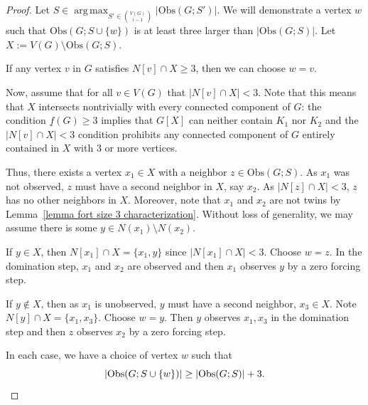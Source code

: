 \documentclass{article}
\DeclareMathOperator*{\argmax}{arg\,max}
\begin{document}
        \begin{proof}
            Let $S\in \displaystyle\argmax_{S'\in\binom{V(G)}{i-1}} |\mathrm{Obs}(G;S')|$.
            We will demonstrate a vertex $w$ such that $\mathrm{Obs}(G;S\cup \{w\})$ is at least three larger than $|\mathrm{Obs}(G;S)|$.
            Let $X:=V(G)\setminus \mathrm{Obs}(G;S)$.
            
            If any vertex $v$ in $G$ satisfies $N[v]\cap X\geq 3$, then we can choose $w=v$. 

            Now, assume that for all $v\in V(G)$ that $|N[v]\cap X| < 3$.
            Note that this means that $X$ intersects nontrivially with every connected component of $G$: the condition $\underline{f}(G)\geq 3$ implies that $G[X]$ can neither contain $K_1$ nor $K_2$ and the $|N[v]\cap X| <3$ condition prohibits any connected component of $G$ entirely contained in $X$ with 3 or more vertices.
            
            Thus, there exists a vertex $x_1\in X$ with a neighbor $z\in \mathrm{Obs}(G;S)$.
            As $x_1$ was not observed, $z$ must have a second neighbor in $X$, say $x_2$. As $|N[z]\cap X| < 3$, $z$ has no other neighbors in $X$. 
            Moreover, note that $x_1$ and $x_2$ are not twins by Lemma~\ref{lemma fort size 3 characterization}.
            Without loss of generality, we may assume there is some $y\in N(x_1)\setminus N(x_2)$. 

            If $y\in X$, then $N[x_1]\cap X=\{x_1,y\}$ since $|N[x_1]\cap X| < 3$.
            Choose $w=z$.
            In the domination step, $x_1$ and $x_2$ are observed and then $x_1$ observes $y$ by a zero forcing step.

            If $y\not\in X$, then as $x_1$ is unobserved, $y$ must have a second neighbor, $x_3 \in X$.
            Note $N[y]\cap X = \{x_1,x_3\}$.
            Choose $w=y$.
            Then $y$ observes $x_1,x_3$ in the domination step and then $z$ observes $x_2$ by a zero forcing step.
            
            In each case, we have a choice of vertex $w$ such that
                \[ 
                |\mathrm{Obs}(G;S\cup \{w\})|\geq |\mathrm{Obs}(G;S)|+3. \qedhere
                \]
        \end{proof}
        
\end{document}
